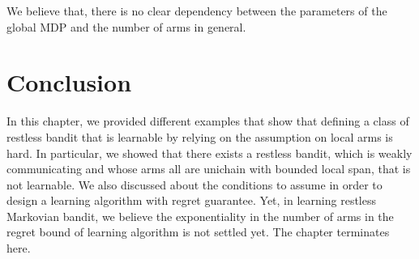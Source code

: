 We believe that, there is no clear dependency between the parameters of the global MDP and the number of arms in general.

\section{Conclusion}
\label{ch:restless:sec:conclude}

In this chapter, we provided different examples that show that defining a class of restless bandit that is learnable by relying on the assumption on local arms is hard.
In particular, we showed that there exists a restless bandit, which is weakly communicating and whose arms all are unichain with bounded local span, that is not learnable.
We also discussed about the conditions to assume in order to design a learning algorithm with regret guarantee.
Yet, in learning restless Markovian bandit, we believe the exponentiality in the number of arms in the regret bound of learning algorithm is not settled yet.
The chapter terminates here.

\endgroup
